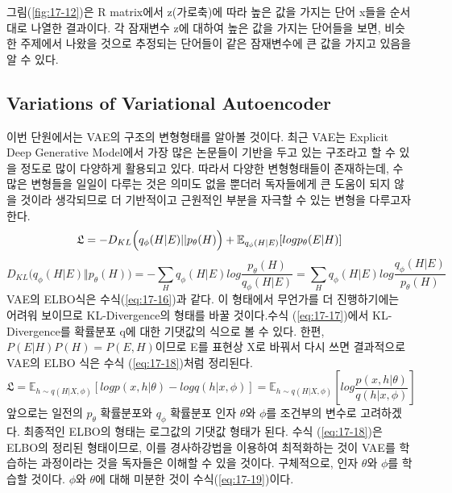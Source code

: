 \documentclass[draft=false]{oblivoir}
\begin{document}
그림(\ref{fig:17-12})은 R matrix에서 z(가로축)에 따라 높은 값을 가지는 단어 x들을 순서대로 나열한 결과이다. 각 잠재변수 z에 대하여 높은 값을 가지는 단어들을 보면, 비슷한 주제에서 나왔을 것으로 추정되는 단어들이 같은 잠재변수에 큰 값을 가지고 있음을 알 수 있다.

\subsection{Variations of Variational Autoencoder}
이번 단원에서는 VAE의 구조의 변형형태를 알아볼 것이다. 최근 VAE는 Explicit Deep Generative Model에서 가장 많은 논문들이 기반을 두고 있는 구조라고 할 수 있을 정도로 많이 다양하게 활용되고 있다. 따라서 다양한 변형형태들이 존재하는데, 수많은 변형들을 일일이 다루는 것은 의미도 없을 뿐더러 독자들에게 큰 도움이 되지 않을 것이라 생각되므로 더 기반적이고 근원적인 부분을 자극할 수 있는 변형을 다루고자 한다.
\begin{equation}
	\mathfrak{L} = -D_{KL}\Big(q_\phi(H|E)|| p_\theta(H) \Big)+\mathbb{E}_{q_\phi(H|E)}[logp_\theta(E|H)]\\
	\label{eq:17-16}
\end{equation}
\begin{equation}
	D_{KL}\Big(q_\phi(H\vert E)\Vert p_\theta(H) \Big)= -\sum_H q_\phi(H|E)log\frac{p_\theta(H)}{q_\phi(H|E)}			=\sum_H q_\phi(H|E)log\frac{q_\phi(H|E)}{p_\theta(H)}
	\label{eq:17-17}
\end{equation}
VAE의 ELBO식은 수식(\ref{eq:17-16})과 같다. 이 형태에서 무언가를 더 진행하기에는 어려워 보이므로 KL-Divergence의 형태를 바꿀 것이다.수식 (\ref{eq:17-17})에서 KL-Divergence를 확률분포 q에 대한 기댓값의 식으로 볼 수 있다. 한편, $P(E|H)P(H)=P(E,H)$이므로 E를 표현상 X로 바꿔서 다시 쓰면 결과적으로 VAE의 ELBO 식은 수식 (\ref{eq:17-18})처럼 정리된다.
\begin{equation}
	\mathfrak{L} = \mathbb{E}_{h\sim q(H|X,\phi)}[logp(x,h|\theta)-logq(h|x,\phi)] = \mathbb{E}_{h\sim q(H|X,\phi)}[log\frac{p(x,h|\theta)}{q(h|x,\phi)}]
	\label{eq:17-18}
\end{equation}
앞으로는 일전의 $p_\theta$ 확률분포와 $q_\phi$ 확률분포 인자 $\theta$와 $\phi$를 조건부의 변수로 고려하겠다. 최종적인 ELBO의 형태는 로그값의 기댓값 형태가 된다. 수식 (\ref{eq:17-18})은 ELBO의 정리된 형태이므로, 이를 경사하강법을 이용하여 최적화하는 것이 VAE를 학습하는 과정이라는 것을 독자들은 이해할 수 있을 것이다. 구체적으로, 인자 $\theta$와 $\phi$를 학습할 것이다. $\phi$와 $\theta$에 대해 미분한 것이 수식(\ref{eq:17-19})이다.
\end{document}
